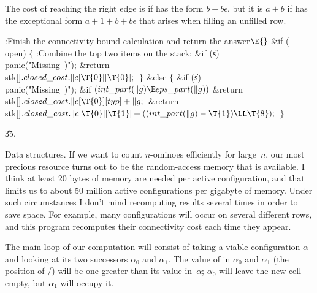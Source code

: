 The cost of reaching the right edge is  if  has the form
$b+b\epsilon$, but it is $a+b$ if  has the exceptional form
$a+1+b+b\epsilon$ that arises when filling an unfilled row.

\Y\B\4:Finish the connectivity bound calculation and return the answer\X${}%
\E{}$\6
\&{if} (\\{open})\5
${}\{{}$\1\6
:Combine the top two items on the stack\X;\6
\&{if} (\|s)\1\5
\\{panic}(\.{"Missing\ )"});\2\6
\&{return} \\{stk}[]${}.\\{closed\_cost}.\|c[\T{0}][\T{0}];{}$\6
\4${}\}{}$\5
\2\&{else}\5
${}\{{}$\1\6
\&{if} (\|s)\1\5
\\{panic}(\.{"Missing\ )"});\2\6
\&{if} ${}(\\{int\_part}(\|g)\E\\{eps\_part}(\|g)){}$\1\5
\&{return} \\{stk}[]${}.\\{closed\_cost}.\|c[\T{0}][\\{typ}]+\|g;{}$\2\6
\&{return} \\{stk}[]${}.\\{closed\_cost}.\|c[\T{0}][\T{1}]+((\\{int%
\_part}(\|g)-\T{1})\LL\T{8});{}$\6
\4${}\}{}$\2\par
\U35.\fi

Data structures. If we want to count $n$-ominoes
efficiently for large~$n$,
our most precious resource turns out to be the random-access memory that
is available. I think at least 20 bytes of memory are needed per active
configuration, and that limits us to about 50 million active configurations per
gigabyte of memory. Under such circumstances I don't mind recomputing results
several times in order to save space. For example, many configurations will
occur on several different rows, and this program recomputes their
connectivity cost each time they appear.

The main loop of our computation will consist of taking a viable configuration
$\alpha$ and looking at its two successors $\alpha_0$ and $\alpha_1$. The
value of  in $\alpha_0$ and $\alpha_1$ (the position of
\qcaret/) will be one greater than its value in~$\alpha$;
$\alpha_0$ will leave the new cell empty, but $\alpha_1$ will occupy it.

